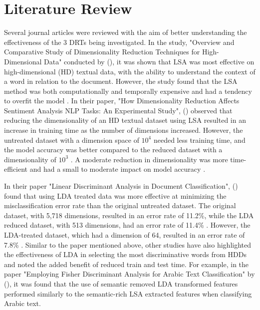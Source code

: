 \documentclass[12pt]{article}
\begin{document}
\section{Literature Review}
\hspace{\parindent} Several journal articles were reviewed with the aim of better understanding the effectiveness of the 3 DRTs being investigated. In the study, "Overview and Comparative Study of Dimensionality Reduction Techniques for High-Dimensional Data" conducted by \citeauthor{ayesha_hanif_talib_2020} (\citeyear{ayesha_hanif_talib_2020}), it was shown that LSA was most effective on high-dimensional (HD) textual data, with the ability to understand the context of a word in relation to the document. However, the study found that the LSA method was both computationally and temporally expensive and had a tendency to overfit the model \parencite{ayesha_hanif_talib_2020}. In their paper, "How Dimensionality Reduction Affects Sentiment Analysis NLP Tasks: An Experimental Study", \citeauthor{10.1007/978-3-031-08337-2_25} (\citeyear{10.1007/978-3-031-08337-2_25}) observed that reducing the dimensionality of an HD textual dataset using LSA resulted in an increase in training time as the number of dimensions increased. However, the untreated dataset with a dimension space of $10^4$ needed less training time, and the model accuracy was better compared to the reduced dataset with a dimensionality of $10^3$ \parencite{10.1007/978-3-031-08337-2_25}. A moderate reduction in dimensionality was more time-efficient and had a small to moderate impact on model accuracy \parencite{10.1007/978-3-031-08337-2_25}.

In their paper "Linear Discriminant Analysis in Document Classification", \citeauthor{torkkola2001linear} (\citeyear{torkkola2001linear}) found that using LDA treated data was more effective at minimizing the misclassification error rate than the original untreated dataset. The original dataset, with 5,718 dimensions, resulted in an error rate of 11.2\%, while the LDA reduced dataset, with 513 dimensions, had an error rate of 11.4\% \parencite{torkkola2001linear}. However, the LDA-treated dataset, which had a dimension of 64, resulted in an error rate of 7.8\% \parencite{torkkola2001linear}. Similar to the paper mentioned above, other studies have also highlighted the effectiveness of LDA in selecting the most discriminative words from HDDs and noted the added benefit of reduced train and test time. For example, in the paper "Employing Fisher Discriminant Analysis for Arabic Text Classification" by \citeauthor{abuzeina2018employing} (\citeyear{abuzeina2018employing}), it was found that the use of semantic removed LDA transformed features performed similarly to the semantic-rich LSA extracted features when classifying Arabic text.
\end{document}
